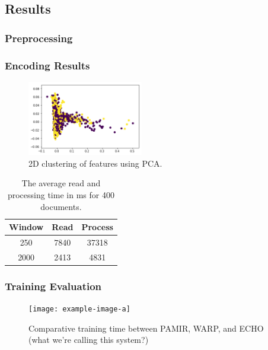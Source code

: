 \subsection{Results}

\subsubsection{Preprocessing}


\subsubsection{Encoding Results}
\begin{figure}[h]
    \centering
    \includegraphics[width=0.45\textwidth]{figures/pca-cluster-hl.png}
    \caption{2D clustering of features using PCA.}
    \label{fig:pcahl}
\end{figure}

\begin{table}[t]
    \centering
    \begin{tabular}{c|cc}
    \textbf{Window} & \textbf{Read} & \textbf{Process} \\ \hline
    250              & 7840           & 37318                    \\
    2000             & 2413           & 4831                   
    \end{tabular}
    \caption{The average read and processing time in ms for 400 documents.}
    \label{tab:base-time}
\end{table}

\subsubsection{Training Evaluation}

\begin{figure}
    \centering
    \texttt{[image: example-image-a]}
    \caption{Comparative training time between PAMIR, WARP, and ECHO (what we're calling this system?)}
    \label{fig:my-label}
\end{figure}

